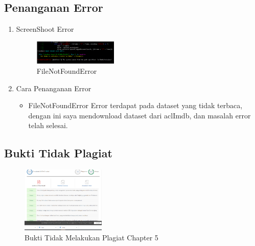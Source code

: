 \subsection{Penanganan Error}
\begin{enumerate}
	\item ScreenShoot Error
	\begin{figure}[H]
		\includegraphics[width=4cm]{figures/1174095/tugas5/err1.PNG}
		\centering
		\caption{FileNotFoundError}
	\end{figure}
	\item Cara Penanganan Error
	\begin{itemize}
		\item FileNotFoundError
		\hfill\break
		Error terdapat pada dataset yang tidak terbaca, dengan ini saya mendownload dataset dari aclImdb, dan masalah error telah selesai.
	\end{itemize}
\end{enumerate}

\subsection{Bukti Tidak Plagiat}
\begin{figure}[H]
\centering
	\includegraphics[width=4cm]{figures/1174095/tugas5/plag.PNG}
	\caption{Bukti Tidak Melakukan Plagiat Chapter 5}
\end{figure}

